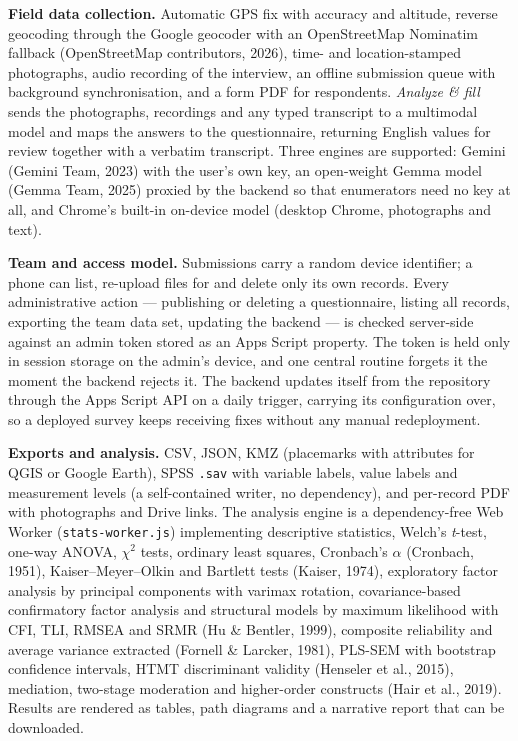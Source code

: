 \documentclass[10pt,a4paper,onecolumn]{article}
\begin{document}
\textbf{Field data collection.} Automatic GPS fix with accuracy and
altitude, reverse geocoding through the Google geocoder with an
OpenStreetMap Nominatim fallback (OpenStreetMap contributors, 2026),
time- and location-stamped photographs, audio recording of the
interview, an offline submission queue with background synchronisation,
and a form PDF for respondents. \emph{Analyze \& fill} sends the
photographs, recordings and any typed transcript to a multimodal model
and maps the answers to the questionnaire, returning English values for
review together with a verbatim transcript. Three engines are supported:
Gemini (Gemini Team, 2023) with the user's own key, an open-weight Gemma
model (Gemma Team, 2025) proxied by the backend so that enumerators need
no key at all, and Chrome's built-in on-device model (desktop Chrome,
photographs and text).

\textbf{Team and access model.} Submissions carry a random device
identifier; a phone can list, re-upload files for and delete only its
own records. Every administrative action --- publishing or deleting a
questionnaire, listing all records, exporting the team data set,
updating the backend --- is checked server-side against an admin token
stored as an Apps Script property. The token is held only in session
storage on the admin's device, and one central routine forgets it the
moment the backend rejects it. The backend updates itself from the
repository through the Apps Script API on a daily trigger, carrying its
configuration over, so a deployed survey keeps receiving fixes without
any manual redeployment.

\textbf{Exports and analysis.} CSV, JSON, KMZ (placemarks with
attributes for QGIS or Google Earth), SPSS \texttt{.sav} with variable
labels, value labels and measurement levels (a self-contained writer, no
dependency), and per-record PDF with photographs and Drive links. The
analysis engine is a dependency-free Web Worker
(\texttt{stats-worker.js}) implementing descriptive statistics, Welch's
\emph{t}-test, one-way ANOVA, \(\chi^2\) tests, ordinary least squares,
Cronbach's \(\alpha\) (Cronbach, 1951), Kaiser--Meyer--Olkin and
Bartlett tests (Kaiser, 1974), exploratory factor analysis by principal
components with varimax rotation, covariance-based confirmatory factor
analysis and structural models by maximum likelihood with CFI, TLI,
RMSEA and SRMR (Hu \& Bentler, 1999), composite reliability and average
variance extracted (Fornell \& Larcker, 1981), PLS-SEM with bootstrap
confidence intervals, HTMT discriminant validity (Henseler et al.,
2015), mediation, two-stage moderation and higher-order constructs (Hair
et al., 2019). Results are rendered as tables, path diagrams and a
narrative report that can be downloaded.
\end{document}
